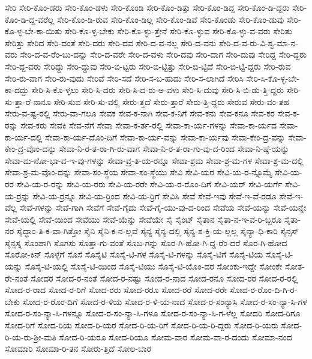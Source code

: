 {ಸೇರಿ
ಸೇರಿ-ಕೊಂ-ಡರು
ಸೇರಿ-ಕೊಂ-ಡಳು
ಸೇರಿ-ಕೊಂಡಿ
ಸೇರಿ-ಕೊಂ-ಡಿತ್ತು
ಸೇರಿ-ಕೊಂ-ಡಿದ್ದ
ಸೇರಿ-ಕೊಂ-ಡಿ-ದ್ದರು
ಸೇರಿ-ಕೊಂ-ಡಿ-ದ್ದ-ವರೆಲ್ಲ
ಸೇರಿ-ಕೊಂ-ಡಿ-ರುವ
ಸೇರಿ-ಕೊಂ-ಡಿಲ್ಲ
ಸೇರಿ-ಕೊಂ-ಡಿವೆ
ಸೇರಿ-ಕೊಂಡು
ಸೇರಿ-ಕೊಂ-ಡುವು
ಸೇರಿ-ಕೊ-ಳ್ಳ-ಬೇ-ಕಾ-ಯಿತು
ಸೇರಿ-ಕೊ-ಳ್ಳ-ಬೇಕು
ಸೇರಿ-ಕೊ-ಳ್ಳು-ತ್ತೇನೆ
ಸೇರಿ-ಕೊ-ಳ್ಳುವ
ಸೇರಿ-ಕೊ-ಳ್ಳು-ವ-ವರು
ಸೇರಿತು
ಸೇರಿತ್ತು
ಸೇರಿದ
ಸೇರಿ-ದಂತೆ
ಸೇರಿ-ದರು
ಸೇರಿ-ದವ
ಸೇರಿ-ದ-ವ-ನಲ್ಲ
ಸೇರಿ-ದ-ವನು
ಸೇರಿ-ದ-ವ-ರು-ವಿ-ಶ್ವ-ಮಾ-ನ-ವರು
ಸೇರಿ-ದ-ವ-ರೆಂ-ಬು-ದನ್ನು
ಸೇರಿ-ದ-ವರೇ
ಸೇರಿ-ದ-ವಳು
ಸೇರಿ-ದವು
ಸೇರಿ-ದಾಗ
ಸೇರಿ-ದುವು
ಸೇರಿದ್ದ
ಸೇರಿ-ದ್ದರು
ಸೇರಿ-ದ್ದ-ವರು
ಸೇರಿದ್ದು
ಸೇರಿ-ದ್ದುವು
ಸೇರಿ-ಬಿ-ಟ್ಟರು
ಸೇರಿ-ಬಿ-ಟ್ಟಿತ್ತು
ಸೇರಿ-ಬಿ-ಟ್ಟಿದೆ
ಸೇರಿ-ಬಿ-ಟ್ಟಿ-ದ್ದರು
ಸೇರಿ-ರುವ
ಸೇರಿ-ರು-ವಾಗ
ಸೇರಿ-ರು-ವುದು
ಸೇರಿವೆ
ಸೇರಿ-ಸದೆ
ಸೇರಿ-ಸ-ಬ-ಹುದು
ಸೇರಿ-ಸ-ಲಾಗಿದೆ
ಸೇರಿಸಿ
ಸೇರಿ-ಸಿ-ಕೊ-ಳ್ಳ-ಬೇ-ಕಾ-ದದ್ದು
ಸೇರಿ-ಸಿ-ಕೊ-ಳ್ಳಲು
ಸೇರಿ-ಸಿ-ದರು
ಸೇರಿ-ಸಿ-ದ-ರು-ಅ-ವಳು
ಸೇರಿ-ಸಿ-ದುವು
ಸೇರಿ-ಸಿ-ಬಿ-ಡು-ತ್ತಿ-ದ್ದರು
ಸೇರಿ-ಸು-ತ್ತಾ-ರೆ-ನಾನೂ
ಸೇರಿ-ಸುವ
ಸೇರಿ-ಸು-ವಲ್ಲಿ
ಸೇರು-ತ್ತದೆ
ಸೇರು-ತ್ತಾರೆ
ಸೇರು-ತ್ತಿ-ದ್ದರು
ಸೇರುವ
ಸೇರು-ವಂ-ತಹ
ಸೇರು-ವ-ಷ್ಟ-ರಲ್ಲಿ
ಸೇರು-ವಾ-ಗಲೂ
ಸೇವಕ
ಸೇವ-ಕ-ನಾಗಿ
ಸೇವ-ಕ-ನಿಗೆ
ಸೇವ-ಕನು
ಸೇವ-ಕನೂ
ಸೇವ-ಕರ
ಸೇವ-ಕ-ರನ್ನು
ಸೇವ-ಕರು
ಸೇವಕಿ
ಸೇವ-ನೆಗೆ
ಸೇವಾ
ಸೇವಾ-ಕ-ರ್ತ-ರಲ್ಲಿ
ಸೇವಾ-ಕಾ-ರ್ಯ-ಗಳನ್ನು
ಸೇವಾ-ಕಾ-ರ್ಯದ
ಸೇವಾ-ಕಾ-ರ್ಯ-ದಲ್ಲಿ
ಸೇವಾ-ಕಾ-ರ್ಯ-ದೊಂ-ದಿಗೆ
ಸೇವಾ-ಕಾ-ರ್ಯ-ವನ್ನು
ಸೇವಾ-ಕಾ-ರ್ಯವು
ಸೇವಾ-ಕೇಂ-ದ್ರ-ವನ್ನು
ಸೇವಾ-ಕೇಂ-ದ್ರ-ವೊಂ-ದನ್ನು
ಸೇವಾ-ನಿ-ರ-ತ-ರಾ-ಗಿ-ರು-ವಾಗ
ಸೇವಾ-ನಿ-ರ-ತ-ರಾ-ಗು-ವು-ದ-ರಿಂದ
ಸೇವಾ-ನಿ-ಷ್ಠೆ-ಯನ್ನು
ಸೇವಾ-ಮ-ನೋ-ಭಾ-ವ-ಇ-ವು-ಗಳನ್ನು
ಸೇವಾ-ವ್ರ-ತಿ-ಯ-ರನ್ನೂ
ಸೇವಾ-ಶ್ರಮ
ಸೇವಾ-ಶ್ರ-ಮ-ಗಳ
ಸೇವಾ-ಶ್ರ-ಮ-ದಲ್ಲಿ
ಸೇವಾ-ಶ್ರ-ಮ-ವೊಂ-ದನ್ನು
ಸೇವಾ-ಸಂ-ಸ್ಥೆಯ
ಸೇವಾ-ಸಂ-ಸ್ಥೆಯು
ಸೇವಿ
ಸೇವಿ-ಯರ
ಸೇವಿ-ಯ-ರ-ನ್ನೊಮ್ಮೆ
ಸೇವಿ-ಯ-ರರ
ಸೇವಿ-ಯ-ರ-ರನ್ನು
ಸೇವಿ-ಯ-ರರು
ಸೇವಿ-ಯ-ರರೇ
ಸೇವಿ-ಯ-ರ-ರೊಂ-ದಿಗೆ
ಸೇವಿ-ಯರ್
ಸೇವಿ-ಯರ್ಗೆ
ಸೇವಿ-ಯ-ರ್ರನ್ನು
ಸೇವಿ-ಯ-ರ್ರನ್ನೂ
ಸೇವಿ-ಯ-ರ್ರಿಂದ
ಸೇವಿ-ಯ-ರ್ರಿಗೆ
ಸೇವಿಸಿ
ಸೇವೆ
ಸೇವೆ-ಇವು
ಸೇವೆ-ಇ-ವೆ-ರಡೂ
ಸೇವೆ-ಇ-ವೆಲ್ಲ
ಸೇವೆ-ಗಳನ್ನು
ಸೇವೆ-ಗಾಗಿ
ಸೇವೆಗೆ
ಸೇವೆ-ಗೈದು
ಸೇವೆ-ಗೈ-ಯು-ವು-ದ-ರಿಂದ
ಸೇವೆಯ
ಸೇವೆ-ಯನ್ನು
ಸೇವೆ-ಯನ್ನೇ
ಸೇವೆ-ಯಲ್ಲಿ
ಸೇವೆ-ಯಿಂದ
ಸೇವೆಯು
ಸೇವೆ-ಯೆನ್ನು
ಸೇವೆಯೇ
ಸೈ
ಸೈಂಟ್
ಸೈತಾನ
ಸೈತಾ-ನ-ಇ-ವ-ರಿ-ಬ್ಬರೂ
ಸೈತಾ-ನರ
ಸೈದ್ಧಾಂ-ತಿ-ಕ-ವಾ-ಗಿತ್ತೋ
ಸೈನಿ
ಸೈನಿ-ಕ-ನ-ಲ್ಲವೆ
ಸೈನ್ಯ
ಸೈನ್ಯ-ದಲ್ಲಿ
ಸೈನ್ಯ-ಶ-ಕ್ತಿ-ಯ-ಲ್ಲಲ್ಲ
ಸೈನ್ಯಾ-ಧಿ-ಕಾರಿ
ಸೈನ್ಸಸ್
ಸೈನ್ಸಸ್ನ
ಸೊಂಪಾಗಿ
ಸೊಗಸು
ಸೊತ್ತಾ-ಗು-ವಂತೆ
ಸೊಬ-ಗನ್ನು
ಸೊರ-ಗಿ-ಹೋ-ಗಿ-ದ್ದ-ರೆಂ-ದರೆ
ಸೊರ-ಗಿ-ಹೋದ
ಸೊರೋ-ಕಿನ್
ಸೊಳ್ಳೆಗೆ
ಸೊಸೆ
ಸೊಸೈಟಿ
ಸೊಸೈ-ಟಿ-ಗಳ
ಸೊಸೈ-ಟಿ-ಗಳನ್ನು
ಸೊಸೈ-ಟಿಗೆ
ಸೊಸೈ-ಟಿಯ
ಸೊಸೈ-ಟಿ-ಯನ್ನು
ಸೊಸೈ-ಟಿ-ಯಲ್ಲಿ
ಸೊಸೈ-ಟಿ-ಯಿಂದ
ಸೊಸೈ-ಟಿಯು
ಸೊಸೈ-ಟಿ-ಯೊಂ-ದರ
ಸೋಂಕು-ಇದ್ದೇ
ಸೋಂಕೇ
ಸೋತ-ರೇ-ನಂತೆ
ಸೋದರ
ಸೋದ-ರ-ನಂತೆ
ಸೋದ-ರ-ನಷ್ಟು
ಸೋದ-ರ-ನಾದ
ಸೋದ-ರನೂ
ಸೋದ-ರರ
ಸೋದ-ರ-ರಲ್ಲಿ
ಸೋದ-ರ-ರಾದ
ಸೋದ-ರ-ರಿಗೆ
ಸೋದ-ರರು
ಸೋದ-ರರೂ
ಸೋದ-ರರೆ
ಸೋದ-ರರೇ
ಸೋದ-ರ-ರೊಂ-ದಿ-ಗಿ-ರ-ಬೇಕು
ಸೋದ-ರ-ರೊಂ-ದಿಗೆ
ಸೋದ-ರ-ಳಿಯ
ಸೋದ-ರ-ಳಿ-ಯ-ನಾದ
ಸೋದ-ರ-ಸಂನ್ಯಾಸಿ
ಸೋದ-ರ-ಸಂ-ನ್ಯಾ-ಸಿ-ಗಳ
ಸೋದ-ರ-ಸಂ-ನ್ಯಾ-ಸಿ-ಗಳನ್ನೂ
ಸೋದ-ರ-ಸಂ-ನ್ಯಾ-ಸಿ-ಗಳೂ
ಸೋದ-ರ-ಸಂ-ನ್ಯಾ-ಸಿ-ಗ-ಳೆಲ್ಲ
ಸೋದರಿ
ಸೋದ-ರಿಗೂ
ಸೋದ-ರಿಗೆ
ಸೋದ-ರಿಯ
ಸೋದ-ರಿ-ಯರ
ಸೋದ-ರಿ-ಯ-ರಿಗೆ
ಸೋದ-ರಿ-ಯ-ರಿ-ದ್ದರು
ಸೋದ-ರಿ-ಯರು
ಸೋದ-ರಿ-ಯ-ರು-ಶ್ರೀ-ಮತಿ
ಸೋದ-ರಿ-ಯರೂ
ಸೋದ-ರಿಯೂ
ಸೋಮ-ವಾರ
ಸೋಮ-ವಾ-ರ-ದಂದು
ಸೋಮಾ-ನಂದ
ಸೋಮಾರಿ
ಸೋಮಾ-ರಿ-ತನ
ಸೋರು-ತ್ತಿದೆ
ಸೋಲ-ಬಾರ
}
